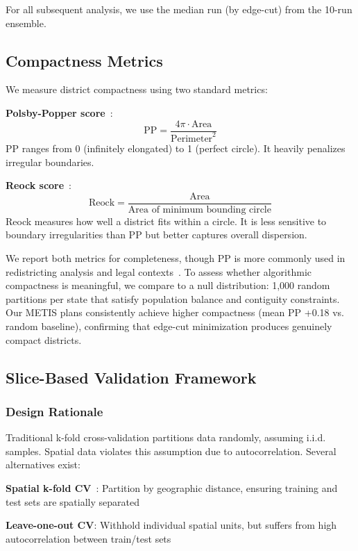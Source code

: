 For all subsequent analysis, we use the median run (by edge-cut) from the 10-run ensemble.

\subsection{Compactness Metrics}

We measure district compactness using two standard metrics:

\textbf{Polsby-Popper score}~\cite{polsby1991}:
\[
\text{PP} = \frac{4\pi \cdot \text{Area}}{\text{Perimeter}^2}
\]
PP ranges from 0 (infinitely elongated) to 1 (perfect circle). It heavily penalizes irregular boundaries.

\textbf{Reock score}~\cite{reock1961}:
\[
\text{Reock} = \frac{\text{Area}}{\text{Area of minimum bounding circle}}
\]
Reock measures how well a district fits within a circle. It is less sensitive to boundary irregularities than PP but better captures overall dispersion.

We report both metrics for completeness, though PP is more commonly used in redistricting analysis and legal contexts~\cite{duchin2018}. To assess whether algorithmic compactness is meaningful, we compare to a null distribution: 1,000 random partitions per state that satisfy population balance and contiguity constraints. Our METIS plans consistently achieve higher compactness (mean PP +0.18 vs. random baseline), confirming that edge-cut minimization produces genuinely compact districts.

\subsection{Slice-Based Validation Framework}

\subsubsection{Design Rationale}

Traditional k-fold cross-validation partitions data randomly, assuming i.i.d. samples. Spatial data violates this assumption due to autocorrelation. Several alternatives exist:

\textbf{Spatial k-fold CV}~\cite{roberts2017}: Partition by geographic distance, ensuring training and test sets are spatially separated

\textbf{Leave-one-out CV}: Withhold individual spatial units, but suffers from high autocorrelation between train/test sets

